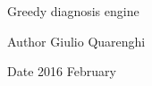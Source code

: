 Greedy diagnosis engine\begin{DoxyAuthor}{Author}
Giulio Quarenghi
\end{DoxyAuthor}
\begin{DoxyDate}{Date}
2016 February 
\end{DoxyDate}
